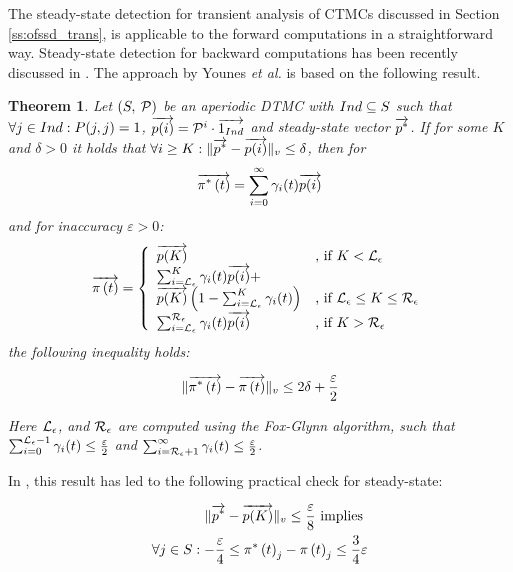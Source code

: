 \documentclass[times, 10pt,twocolumn]{article}
\newtheorem{theorem}{Theorem}
\begin{document}
	
		The steady-state detection for transient analysis of CTMCs discussed in Section \ref{ss:ofssd_trans}, is applicable to the forward computations in a straightforward way.
Steady-state detection for backward computations has been recently discussed in \cite{YounesKNP_STTT05}.  The approach by Younes \emph{et al.} is based on the following result.

		\begin{theorem}
			Let $\left( S,\: \mathcal{P} \right)$ be an aperiodic DTMC with $Ind \subseteq S$ such that $\forall j \in Ind : P(j,j) = 1$, $\overrightarrow{p(i)}=\mathcal{P}^{i} \cdot \overrightarrow{1_{Ind}}$ and steady-state vector $\overrightarrow{p^{*}}$. If for some $K$ and $\delta > 0$ it holds that $\forall i \geq K:\lVert \overrightarrow{p^{*}} - \overrightarrow{p(i)} \rVert_{v} \leq \delta$, then for
			{\small
			\[
				\overrightarrow{\pi^{*} \left( t \right)} = \sum_{i=0}^{\infty}\gamma_{i}(t) \overrightarrow{p(i)}
			\]
			}
			and for inaccuracy $\varepsilon > 0$:
			{\small
			\begin{equation}
				\displaystyle
				\overrightarrow{\pi \left( t \right) } = \left\{
				\begin{array}{ll}
					\overrightarrow{p(K)} & \text{, if } K < \mathcal{L}_{\epsilon}\\
					\sum_{i=\mathcal{L}_{\epsilon}}^{K}\gamma_{i}(t) \overrightarrow{p(i)} + & \\ \overrightarrow{p(K)} \left(1- \sum_{i=\mathcal{L}_{\epsilon}}^{K}\gamma_{i}(t) \right) & \text{, if } \mathcal{L}_{\epsilon} \leq K \leq \mathcal{R}_{\epsilon}\\
					\sum_{i=\mathcal{L}_{\epsilon}}^{\mathcal{R}_{\epsilon}}\gamma_{i}(t) \overrightarrow{p(i)} & \text{, if } K > \mathcal{R}_{\epsilon}\\
				\end{array}
				\right .
				\label{eq:ssd_LR_b}
			\end{equation}
			}
			the following inequality holds:
			{\small
			\begin{fframe}{0.5}{-0.3}
				\[
					\lVert  \overrightarrow{\pi^{*} \left( t \right)} - \overrightarrow{\pi \left( t \right) }  \rVert_{v} \leq 2 \delta + \frac{\varepsilon}{2}
				\]
			\end{fframe}
			}
			Here $\mathcal{L}_{\epsilon}$, and $\mathcal{R}_{\epsilon}$ are computed using the Fox-Glynn algorithm, such that $\sum_{i=0}^{\mathcal{L}_{\epsilon}{-}1} \gamma_{i}(t) \leq \frac{\varepsilon}{2}$ and $\sum_{i=\mathcal{R}_{\epsilon}{+}1}^{\infty} \gamma_{i}(t) \leq \frac{\varepsilon}{2}$.
			\label{th:error_bwd_initial}
		\end{theorem}
		In \cite{YounesKNP_STTT05}, this result has led to the following practical check for steady-state:
		{\small
			\begin{fframe}{0.78}{-0.3}
				\begin{eqnarray}
					\lVert \overrightarrow{p^{*}} - \overrightarrow{p(K)} \rVert_{v} \leq \frac{\varepsilon}{8} \text{ implies } \nonumber \\
					\forall j \in S : -\frac{\varepsilon}{4} \leq \pi^{*} \left( t \right)_{j} - \pi \left( t \right)_{j} \leq \frac{3}{4}\varepsilon \label{eq:youn_cr_cor}
				\end{eqnarray}
			\end{fframe}
		}
		
\end{document}
